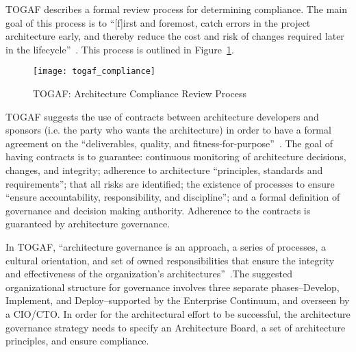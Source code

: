TOGAF describes a formal review process for determining compliance. The main goal of this process is to ``[f]irst and foremost, catch errors in the project architecture early, and thereby reduce the cost and risk of changes required later in the lifecycle''~\cite[Ch. 48.3.1]{togaf9.1}. This process is outlined in Figure~\ref{fig:togaf_compliance}.

\begin{figure}
\texttt{[image: togaf\_compliance]}
\caption[TOGAF: Architecture Compliance Review Process]{TOGAF: Architecture Compliance Review Process~\cite[Sec. 48.4.1]{togaf9.1}}
\label{fig:togaf_compliance}
\end{figure}



TOGAF suggests the use of contracts between architecture developers and sponsors (i.e. the party who wants the architecture) in order to have a formal agreement on the ``deliverables, quality, and fitness-for-purpose''~\cite[Ch. 49]{togaf9.1}. The goal of having contracts is to guarantee: continuous monitoring of architecture decisions, changes, and integrity; adherence to architecture ``principles, standards and requirements''; that all risks are identified;  the existence of processes to ensure ``ensure accountability, responsibility, and discipline''; and a formal definition of governance and decision making authority. Adherence to the contracts is guaranteed by architecture governance.

In TOGAF, ``architecture governance is an approach, a series of processes, a cultural orientation, and set of owned responsibilities that ensure the integrity and effectiveness of the organization's architectures''~\cite[Ch. 50]{togaf9.1}.The suggested organizational structure for governance involves three separate phases--Develop, Implement, and Deploy--supported by the Enterprise Continuum, and overseen by a CIO/CTO. In order for the architectural effort to be successful, the architecture governance strategy needs to specify an Architecture Board, a set of architecture principles, and ensure compliance.  %
%

